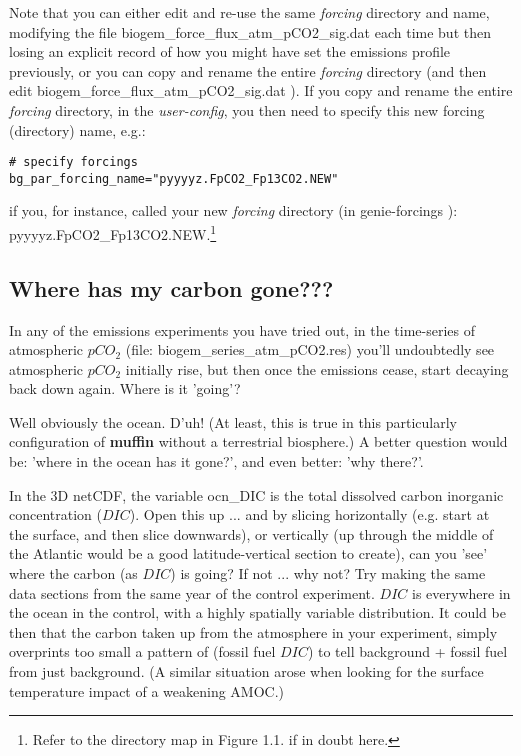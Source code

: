 Note that you can either edit and re-use the same \textit{forcing} directory and name, modifying the file \footnotesize\textsf{biogem\_force\_flux\_atm\_pCO2\_sig.dat }\normalsize each time but then losing an explicit record of how you might have set the emissions profile previously, or you can copy and rename the entire \textit{forcing} directory (and then edit \footnotesize\textsf{biogem\_force\_flux\_atm\_pCO2\_sig.dat }\normalsize). If you copy and rename the entire \textit{forcing} directory, in the \textit{user-config}, you then need to specify this new forcing (directory) name, e.g.:
\vspace{-2pt}\small\begin{verbatim}
# specify forcings
bg_par_forcing_name="pyyyyz.FpCO2_Fp13CO2.NEW"
\end{verbatim}\normalsize\vspace{-2pt}
if you, for instance, called your new \textit{forcing} directory (in \footnotesize\textsf{genie-forcings }\normalsize): \footnotesize\textsf{pyyyyz.FpCO2\_Fp13CO2.NEW}\normalsize.\footnote{Refer to the directory map in Figure 1.1. if in doubt here.}

\vspace{20pt}

\newpage

\subsection{Where has my carbon gone???}

In any of the emissions experiments you have tried out, in the time-series of atmospheric \(pCO_{2}\) (file: \textsf{\footnotesize biogem\_series\_atm\_pCO2.res}) you'll undoubtedly see atmospheric \(pCO_{2}\) initially rise, but then once the emissions cease, start decaying back down again. Where is it 'going'?

Well obviously the ocean. D'uh! (At least, this is true in this particularly configuration of \textbf{muffin} without a terrestrial biosphere.) A better question would be: 'where in the ocean has it gone?', and even better: 'why there?'.

In the 3D netCDF, the variable \textsf{\footnotesize ocn\_DIC} is the total dissolved carbon inorganic concentration (\(DIC\)). Open this up ... and by slicing horizontally (e.g. start at the surface, and then slice downwards), or vertically (up through the middle of the Atlantic would be a good latitude-vertical section to create), can you 'see' where the carbon (as \(DIC\)) is going? If not ... why not? Try making the same data sections from the same year of the control experiment. \(DIC\) is everywhere in the ocean in the control, with a highly spatially variable distribution. It could be then that the carbon taken up from the atmosphere in your experiment, simply overprints too small a pattern of (fossil fuel \(DIC\)) to tell background + fossil fuel from just background. (A similar situation arose when looking for the surface temperature impact of a weakening AMOC.)

